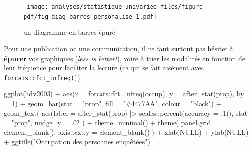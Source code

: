 \documentclass[
  letterpaper,
  DIV=11,
  numbers=noendperiod,
  oneside]{scrreprt}
\newenvironment{Shaded}{\begin{snugshade}}{\end{snugshade}}
\newcommand{\AttributeTok}[1]{\textcolor[rgb]{0.40,0.45,0.13}{#1}}
\newcommand{\ConstantTok}[1]{\textcolor[rgb]{0.56,0.35,0.01}{#1}}
\newcommand{\DecValTok}[1]{\textcolor[rgb]{0.68,0.00,0.00}{#1}}
\newcommand{\FunctionTok}[1]{\textcolor[rgb]{0.28,0.35,0.67}{#1}}
\newcommand{\NormalTok}[1]{\textcolor[rgb]{0.00,0.23,0.31}{#1}}
\newcommand{\SpecialCharTok}[1]{\textcolor[rgb]{0.37,0.37,0.37}{#1}}
\newcommand{\StringTok}[1]{\textcolor[rgb]{0.13,0.47,0.30}{#1}}
\begin{document}
\begin{figure}[H]

{\centering \texttt{[image: analyses/statistique-univariee\_files/figure-pdf/fig-diag-barres-personalise-1.pdf]}

}

\caption{\label{fig-diag-barres-personalise}un diagramme en barres
épuré}

\end{figure}

Pour une publication ou une communication, il ne faut surtout pas
hésiter à \textbf{épurer} vos graphiques (\emph{less is better!}), voire
à trier les modalités en fonction de leur fréquence pour faciliter la
lecture (ce qui se fait aisément avec \texttt{forcats::fct\_infreq()}).

\begin{Shaded}
\begin{Highlighting}[]
\FunctionTok{ggplot}\NormalTok{(hdv2003) }\SpecialCharTok{+}
  \FunctionTok{aes}\NormalTok{(}\AttributeTok{x =}\NormalTok{ forcats}\SpecialCharTok{::}\FunctionTok{fct\_infreq}\NormalTok{(occup), }
      \AttributeTok{y =} \FunctionTok{after\_stat}\NormalTok{(prop), }\AttributeTok{by =} \DecValTok{1}\NormalTok{) }\SpecialCharTok{+}
  \FunctionTok{geom\_bar}\NormalTok{(}\AttributeTok{stat =} \StringTok{"prop"}\NormalTok{, }
           \AttributeTok{fill =} \StringTok{"\#4477AA"}\NormalTok{, }\AttributeTok{colour =} \StringTok{"black"}\NormalTok{) }\SpecialCharTok{+}
  \FunctionTok{geom\_text}\NormalTok{(}
    \FunctionTok{aes}\NormalTok{(}\AttributeTok{label =} \FunctionTok{after\_stat}\NormalTok{(prop) }\SpecialCharTok{|\textgreater{}} 
\NormalTok{          scales}\SpecialCharTok{::}\FunctionTok{percent}\NormalTok{(}\AttributeTok{accuracy =}\NormalTok{ .}\DecValTok{1}\NormalTok{)),}
    \AttributeTok{stat =} \StringTok{"prop"}\NormalTok{,}
    \AttributeTok{nudge\_y =}\NormalTok{ .}\DecValTok{02}
\NormalTok{  ) }\SpecialCharTok{+}
  \FunctionTok{theme\_minimal}\NormalTok{() }\SpecialCharTok{+}
  \FunctionTok{theme}\NormalTok{(}
    \AttributeTok{panel.grid =} \FunctionTok{element\_blank}\NormalTok{(),}
    \AttributeTok{axis.text.y =} \FunctionTok{element\_blank}\NormalTok{()}
\NormalTok{  ) }\SpecialCharTok{+}
  \FunctionTok{xlab}\NormalTok{(}\ConstantTok{NULL}\NormalTok{) }\SpecialCharTok{+} \FunctionTok{ylab}\NormalTok{(}\ConstantTok{NULL}\NormalTok{) }\SpecialCharTok{+}
  \FunctionTok{ggtitle}\NormalTok{(}\StringTok{"Occupation des personnes enquêtées"}\NormalTok{)}
\end{Highlighting}
\end{Shaded}
\end{document}
